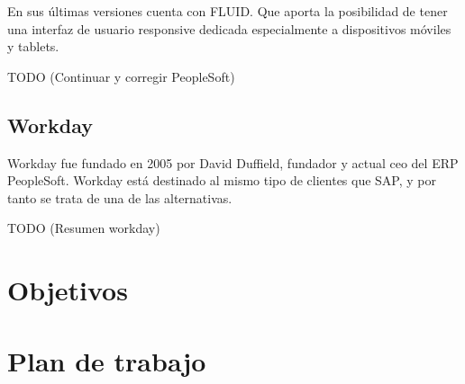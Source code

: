 En sus últimas versiones cuenta con FLUID. Que aporta la posibilidad de tener una interfaz de usuario responsive dedicada especialmente a dispositivos móviles y tablets.

TODO (Continuar y corregir PeopleSoft)

\subsection{Workday}
Workday fue fundado en 2005 por David Duffield, fundador y actual \acrshort{ceo} del ERP PeopleSoft. Workday está destinado al mismo tipo de clientes que SAP, y por tanto se trata de una de las alternativas.

TODO (Resumen workday)



\section{Objetivos}


\section{Plan de trabajo}